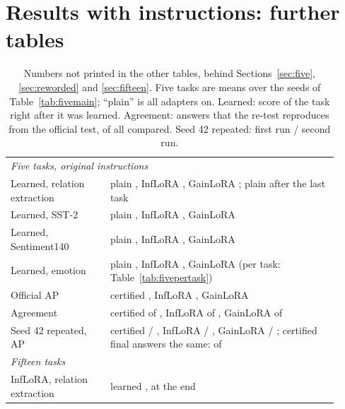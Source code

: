 \section{Results with instructions: further tables}
\label{app:instmore}

\begin{table}[!htbp]
  \caption{Numbers not printed in the other tables, behind Sections~\ref{sec:five}, \ref{sec:reworded} and \ref{sec:fifteen}. Five tasks are means over the seeds of Table~\ref{tab:fivemain}; ``plain'' is all adapters on. Learned: score of the task right after it was learned. Agreement: answers that the re-test reproduces from the official test, of all compared. Seed 42 repeated: first run / second run.}
  \label{tab:instdetail}
  \centering
  \footnotesize
  \begin{tabular}{p{0.28\linewidth}p{0.64\linewidth}}
    \toprule
    \multicolumn{2}{l}{\textit{Five tasks, original instructions}}\\
    Learned, relation extraction & plain \FivePlainRelationLearned{}, InfLoRA \FiveInfRelationLearned{}, GainLoRA \FiveGainRelationLearned{}; plain after the last task \FivePlainRelationEnd{}\\
    Learned, SST-2 & plain \FivePlainSstLearned{}, InfLoRA \FiveInfSstLearned{}, GainLoRA \FiveGainSstLearned{}\\
    Learned, Sentiment140 & plain \FivePlainSentimentLearned{}, InfLoRA \FiveInfSentimentLearned{}, GainLoRA \FiveGainSentimentLearned{}\\
    Learned, emotion & plain \FivePlainEmotionLearned{}, InfLoRA \FiveInfEmotionLearned{}, GainLoRA \FiveGainEmotionLearned{} (per task: Table~\ref{tab:fivepertask})\\
    Official AP & certified \FiveCertOffAP{}, InfLoRA \FiveInfOffAP{}, GainLoRA \FiveGainOffAP{}\\
    Agreement & certified \FiveCertSame{} of \FiveCertSameOf{}, InfLoRA \FiveInfSame{} of \FiveInfSameOf{}, GainLoRA \FiveGainSame{} of \FiveGainSameOf{}\\
    Seed 42 repeated, AP & certified \RepeatCertFirst{} / \RepeatCertSecond{}, InfLoRA \RepeatInfFirst{} / \RepeatInfSecond{}, GainLoRA \RepeatGainFirst{} / \RepeatGainSecond{}; certified final answers the same: \RepeatCertSame{} of \RepeatCertTotal{}\\
    \midrule
    \multicolumn{2}{l}{\textit{Fifteen tasks}}\\
    InfLoRA, relation extraction & learned \FifteenInfRelationLearned{}, at the end \FifteenInfRelationEnd{}\\

\end{tabular}
\end{table}
